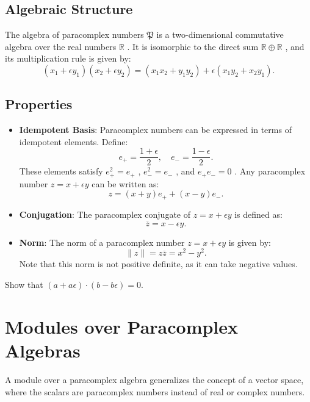 \subsection{Algebraic Structure}
The algebra of paracomplex numbers   $\mathfrak{P} $  is a two-dimensional commutative algebra over the real numbers   $\mathbb{R}$   . It is isomorphic to the direct sum  $ \mathbb{R} \oplus \mathbb{R} $  , and its multiplication rule is given by:
\[
(x_1 + \epsilon y_1)(x_2 + \epsilon y_2) = (x_1x_2 + y_1y_2) + \epsilon (x_1y_2 + x_2y_1).
\]

\subsection{Properties}
\begin{itemize}
    \item \textbf{Idempotent Basis}: Paracomplex numbers can be expressed in terms of idempotent elements. Define:
    \[
    e_+ = \frac{1 + \epsilon }{2}, \quad e_- = \frac{1 - \epsilon }{2}.
    \]
    These elements satisfy  $ e_+^2 = e_+ $  ,   $e_-^2 = e_- $  , and   $e_+ e_- = 0 $ . Any paracomplex number   $z = x + \epsilon y  $  can be written as:
    \[
    z = (x + y)e_+ + (x - y)e_-.
    \]

    \item \textbf{Conjugation}: The paracomplex conjugate of  $ z = x + \epsilon y $   is defined as:
    \[
    \overline{z} = x - \epsilon y.
    \]

    \item \textbf{Norm}: The norm of a paracomplex number   $z = x + \epsilon y $   is given by:
    \[
    \|z\| = z \overline{z} = x^2 - y^2.
    \]
    Note that this norm is not positive definite, as it can take negative values.
\end{itemize}

\begin{ex}
Show that $(a+a\epsilon)\cdot(b-b\epsilon)=0$.
\end{ex}
\section{Modules over Paracomplex Algebras}
A module over a paracomplex algebra generalizes the concept of a vector space, where the scalars are paracomplex numbers instead of real or complex numbers.

